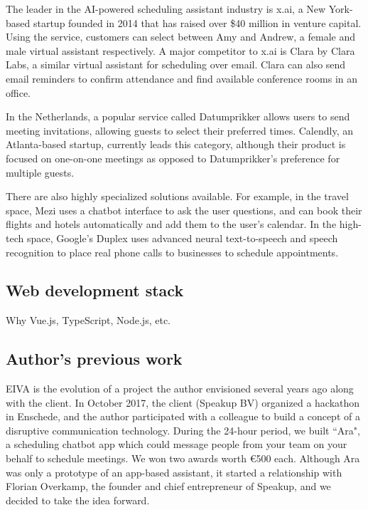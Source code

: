 \documentclass{article}
\begin{document}
The leader in the AI-powered scheduling assistant industry is x.ai, a New York-based startup founded in 2014 that has raised over \$40 million in venture capital. Using the service, customers can select between Amy and Andrew, a female and male virtual assistant respectively. A major competitor to x.ai is Clara by Clara Labs, a similar virtual assistant for scheduling over email. Clara can also send email reminders to confirm attendance and find available conference rooms in an office.

In the Netherlands, a popular service called Datumprikker allows users to send meeting invitations, allowing guests to select their preferred times. Calendly, an Atlanta-based startup, currently leads this category, although their product is focused on one-on-one meetings as opposed to Datumprikker's preference for multiple guests.

There are also highly specialized solutions available. For example, in the travel space, Mezi uses a chatbot interface to ask the user questions, and can book their flights and hotels automatically and add them to the user's calendar. In the high-tech space, Google's Duplex uses advanced neural text-to-speech and speech recognition to place real phone calls to businesses to schedule appointments.

\subsection{Web development stack}

Why Vue.js, TypeScript, Node.js, etc.

\subsection{Author's previous work}

EIVA is the evolution of a project the author envisioned several years ago along with the client. In October 2017, the client (Speakup BV) organized a hackathon in Enschede, and the author participated with a colleague to build a concept of a disruptive communication technology. During the 24-hour period, we built ``Ara", a scheduling chatbot app which could message people from your team on your behalf to schedule meetings. We won two awards worth €500 each. Although Ara was only a prototype of an app-based assistant, it started a relationship with Florian Overkamp, the founder and chief entrepreneur of Speakup, and we decided to take the idea forward.
\end{document}
